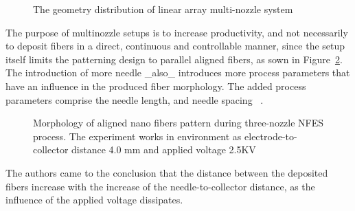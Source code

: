 \documentclass[5p,,preprint,12pt,twocolumn]{elsarticle}
\makeatletter
\def\fixFloatSize#1{}%
\makeatother
\begin{document}
\bgroup
\fixFloatSize{images/cd8e0617-d4d9-479b-a99b-a466cd21483c-uwang_01.png}
\begin{figure}[!htbp]
\centering \makeatletter{}
\makeatother 
\caption{{The geometry distribution of linear array multi-nozzle system \unskip~\protect\cite{527120:11974323}}}
\label{f-4a1a1f58a423}
\end{figure}
\egroup
The purpose of multinozzle setups is to increase productivity, and not necessarily to deposit fibers in a direct, continuous and controllable manner, since the setup itself limits the patterning design to parallel aligned fibers, as sown in Figure~\ref{f-4f1fb5cbfee6}. The introduction of more needle \_also\_ introduces more process parameters that have an influence in the produced fiber morphology. The added process parameters comprise the needle length, and needle spacing \unskip~\cite{527120:11974323}.


\bgroup
\fixFloatSize{images/9569179c-0fea-4f46-bb0f-b3103fbd20aa-uwang_02.png}
\begin{figure}[!htbp]
\centering \makeatletter{}
\makeatother 
\caption{{Morphology of aligned nano fibers pattern during three-nozzle NFES process. The experiment works in environment as electrode-to-collector distance 4.0 mm and applied voltage 2.5KV \unskip~\protect\cite{527120:11974323}}}
\label{f-4f1fb5cbfee6}
\end{figure}
\egroup
The authors came to the conclusion that the distance between the deposited fibers increase with the increase of the needle-to-collector distance, as the influence of the applied voltage dissipates.
\end{document}
